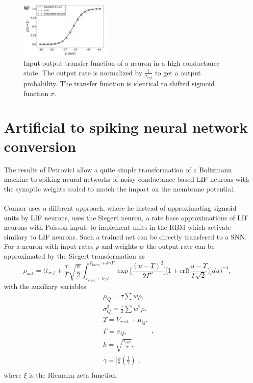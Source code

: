 \begin{figure}
	\centering
    	\includegraphics[width=0.4\textwidth]{imgs/snn_sample5.png} 
    \caption{Input output transfer function of a neuron in a high conductance state. The output rate is normalized by $\frac{1}{\tau_{ref}}$ to get a output probability. The transfer function is identical to shifted sigmoid function $\sigma$.}
	\label{fig:snnsmap4}
\end{figure}

\section{Artificial to spiking neural network conversion}

The results of Petrovici allow a quite simple transformation of a Boltzmann machine to spiking neural networks of noisy conductance based LIF neurons with the synaptic weights scaled to match the impact on the membrane potential.
\\
\\
Connor uses a different approach, where he instead of approximating sigmoid units by LIF neurons, uses the Siegert neuron, a rate base approximations of LIF neurons with Poisson input, to implement units in the RBM which activate similary to LIF neurons. 
Such a trained net can be directly transfered to a SNN.
For a neuron with input rates $\rho$ and weights $w$ the output rate can be approximated by the Siegert transformation as
\[
\rho_{out} = \bigg(t_{ref} + \frac{\tau}{\Gamma} \sqrt{\frac{\pi}{2}} \int_{V_{reset}+k\gamma\Gamma}^{V_{thres}+k\gamma\Gamma} \exp \Big[ \frac{(u - \Upsilon)^2}{2 \Gamma^2} \Big] \Big[ 1 + \text{erf} \Big( \frac{u - \Upsilon}{\Gamma \sqrt{2}} \Big) \Big] du \bigg)^{-1},
\] 
with the auxiliary variables
\[
\begin{split}
	\mu_Q = \tau \sum w \rho ,\\
	\sigma_Q^2 = \frac{\tau}{2} \sum w^2 \rho,\\
	\Upsilon = V_{rest} + \mu_Q ,\\
	\Gamma = \sigma_Q ,\\
	k = \sqrt{\frac{\tau_{syn}}{\tau}},\\
	\gamma = |\xi(\frac{1}{2})|,\\
\end{split},
\]
where $\xi$ is the Riemann zeta function.

